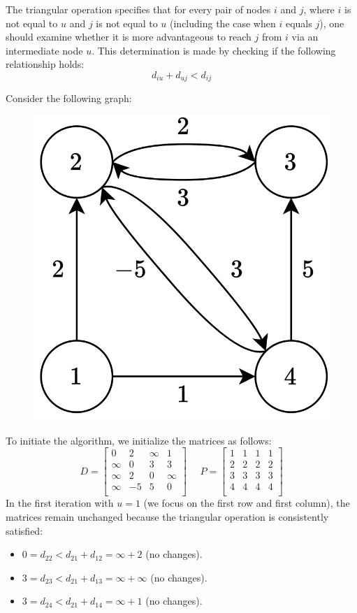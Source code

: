 \begin{definition}
    The triangular operation specifies that for every pair of nodes $i$ and $j$, where $i$ is not equal to $u$ and $j$ is not equal to $u$ (including the case when $i$ equals $j$), one should examine whether it is more advantageous to reach $j$ from $i$ via an intermediate node $u$. 
    This determination is made by checking if the following relationship holds:
    \[d_{iu}+d_{uj} < d_{ij}\]
\end{definition}

\begin{example}
    Consider the following graph:
    \begin{figure}[H]
        \centering
        \includegraphics[width=0.2\linewidth]{images/floyd.png}
    \end{figure}
    To initiate the algorithm, we initialize the matrices as follows:
    \[D=\begin{bmatrix}
        0 & 2 & \infty & 1 \\
        \infty & 0 & 3 & 3 \\
        \infty & 2 & 0 & \infty \\
        \infty & -5 & 5 & 0 \\
    \end{bmatrix}
    \:\:\:\:\:\:
    P=\begin{bmatrix}
        1 & 1 & 1 & 1 \\
        2 & 2 & 2 & 2 \\
        3 & 3 & 3 & 3 \\
        4 & 4 & 4 & 4 \\
    \end{bmatrix}
    \]
    In the first iteration with $u=1$ (we focus on the first row and first column), the matrices remain unchanged because the triangular operation is consistently satisfied:
    \begin{itemize}
        \item $0=d_{22} < d_{21} + d_{12} = \infty + 2$ (no changes). 
        \item $3=d_{23} < d_{21} + d_{13} = \infty + \infty$ (no changes). 
        \item $3=d_{24} < d_{21} + d_{14} = \infty + 1$ (no changes). 

\end{itemize}
\end{example}
